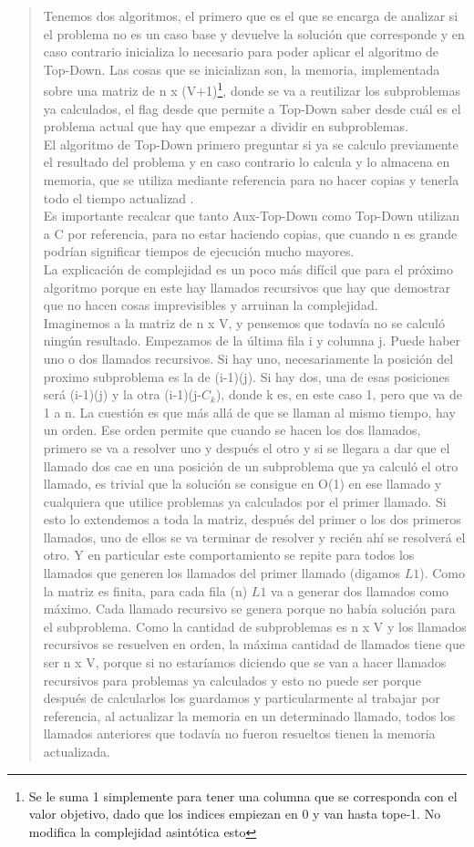 \documentclass[8pt,a4paper]{article}
\begin{document}
\begin{verse}
Tenemos dos algoritmos, el primero que es el que se encarga de analizar si el problema no es un caso base y devuelve la solución que corresponde y en caso contrario inicializa lo necesario para poder aplicar el algoritmo de Top-Down. Las cosas que se inicializan son, la memoria, implementada sobre una matriz de n x (V+1)\footnote{Se le suma 1 simplemente para tener una columna que se corresponda con el valor objetivo, dado que los indices empiezan en 0 y van hasta tope-1. No modifica la complejidad asintótica esto}, donde se va a reutilizar los subproblemas ya calculados, el flag desde que permite a Top-Down saber desde cuál es el problema actual que hay que empezar a dividir en subproblemas.\\ El algoritmo de Top-Down primero preguntar si ya se calculo previamente el resultado del problema y en caso contrario lo calcula y lo almacena en memoria, que se utiliza mediante referencia para no hacer copias y tenerla todo el tiempo actualizad .\\ Es importante recalcar que tanto Aux-Top-Down como Top-Down utilizan a C por referencia, para no estar haciendo copias, que cuando n es grande podrían significar tiempos de ejecución mucho mayores.
\\
La explicación de complejidad es un poco más difícil que para el próximo algoritmo porque en este hay llamados recursivos que hay que demostrar que no hacen cosas imprevisibles y arruinan la complejidad.\\
Imaginemos a la matriz de n x V, y pensemos que todavía no se calculó ningún resultado. Empezamos de la última fila i y columna j. Puede haber uno o dos llamados recursivos. Si hay uno, necesariamente la posición del proximo subproblema es la de (i-1)(j). Si hay dos,  una de esas posiciones será (i-1)(j)  y la otra (i-1)(j-$C_{k}$), donde k es, en este caso 1, pero que va de 1 a n. La cuestión es que más allá de que se llaman al mismo tiempo, hay un orden. Ese orden permite que cuando se hacen los dos llamados, primero se va a resolver uno y después el otro y si se llegara a dar que el llamado dos cae en una posición de un subproblema que ya calculó el otro llamado, es trivial que la solución se consigue en O(1) en ese llamado y cualquiera que utilice problemas ya calculados por el primer llamado. Si esto lo extendemos a toda la matriz, después del primer o los dos primeros llamados, uno de ellos se va terminar de resolver y recién ahí se resolverá el otro. Y en particular este comportamiento se repite para todos los llamados que generen los llamados del primer llamado (digamos $L{1}$). Como la matriz es finita, para cada fila (n) $L{1}$ va a generar dos llamados como máximo. Cada llamado recursivo se genera porque no había solución para el subproblema. Como la cantidad de subproblemas es n x V y los llamados recursivos se resuelven en orden, la máxima cantidad de llamados tiene que ser n x V, porque si no estaríamos diciendo que se van a hacer llamados recursivos para problemas ya calculados y esto no puede ser porque después de calcularlos los guardamos y particularmente al trabajar por referencia, al actualizar la memoria en un determinado llamado, todos los llamados anteriores que todavía no fueron resueltos tienen la memoria actualizada.

\end{verse}
\end{document}
